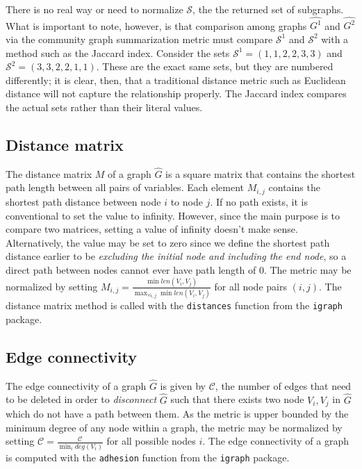 There is no real way or need to normalize $\mathcal{S}$, the the returned set 
of subgraphs. What is important to note, however, is that comparison among 
graphs $\hat{G^1}$ and $\hat{G^2}$ via the community graph summarization metric 
must compare $\mathcal{S}^1$ and $\mathcal{S}^2$ with a method such as the 
Jaccard index. Consider the sets $\mathcal{S}^1=(1,1,2,2,3,3)$ and 
$\mathcal{S}^2=(3,3,2,2,1,1)$. These are 
the exact same sets, but they are numbered differently; it is clear, then, that 
a traditional distance metric such as Euclidean distance will not capture the 
relationship properly. The Jaccard index compares the actual sets rather than 
their literal values.

\subsection{Distance matrix}

The distance matrix $M$ of a graph $\hat{G}$ is a square matrix that 
contains the shortest path length 
between all pairs of variables. Each element $M_{i,j}$ 
contains the shortest path distance between node $i$ to node $j$. If no path 
exists, it is conventional to set the value to infinity. However, since the 
main purpose is to compare two matrices, 
setting a value of infinity doesn't make sense. Alternatively, the value may be 
set to zero since we define the shortest path distance earlier to be 
\textit{excluding the initial node and including the end node}, so a direct 
path between nodes cannot ever have path length of 0. The metric may be 
normalized by setting $M_{i,j} = \frac{\min len(V_i,V_j)}{\max_{\forall i,j} 
\min len(V_i,V_j)}$ for all node pairs $(i,j)$.
The distance matrix method is called with the \texttt{distances} function from 
the \texttt{igraph} package.

\subsection{Edge connectivity}

The edge connectivity of a graph $\hat{G}$ is given by $\mathcal{C}$, the 
number of edges that need to be deleted in order to \textit{disconnect} 
$\hat{G}$ such that there exists two node $V_i,V_j$ in $\hat{G}$ which do not 
have a path between them.
As the metric is upper bounded by the minimum 
degree of any node within a graph, the metric may be normalized by setting 
$\mathcal{C} = \frac{\mathcal{C}}{\min_i deg(V_i)}$ for all possible nodes $i$.
The edge connectivity of a graph is computed 
with the \texttt{adhesion} function from the \texttt{igraph} package. 

